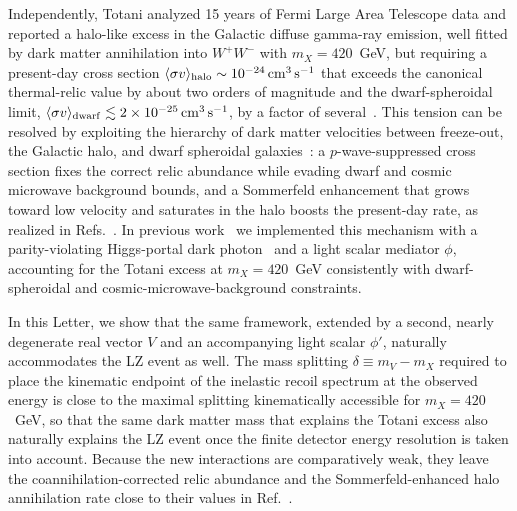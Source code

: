 \documentclass[aps,prl,twocolumn,superscriptaddress,nofootinbib]{revtex4-2}
\begin{document}
Independently, Totani analyzed 15 years of Fermi Large Area Telescope
data and reported a halo-like excess in the Galactic diffuse gamma-ray
emission, well fitted by dark matter annihilation into $W^+W^-$ with
$m_X=420$~GeV, but requiring a present-day cross section
$\langle\sigma v\rangle_{\rm halo}\sim10^{-24}\,{\rm cm}^3\,{\rm s}^{-1}$
that exceeds the canonical thermal-relic value by about two orders of
magnitude and the dwarf-spheroidal limit,
$\langle\sigma v\rangle_{\rm dwarf}\lesssim2\times10^{-25}\,{\rm
cm}^3\,{\rm s}^{-1}$, by a factor of several~\cite{Totani2025}. This
tension can be resolved by exploiting the hierarchy of dark matter
velocities between freeze-out, the Galactic halo, and dwarf spheroidal
galaxies~\cite{Murayama2025,NomuraTotani2026}: a $p$-wave-suppressed
cross section fixes the correct relic abundance while evading dwarf and
cosmic microwave background bounds, and a Sommerfeld enhancement that
grows toward low velocity and saturates in the halo boosts the
present-day rate, as realized in
Refs.~\cite{Jho2025,Yoshimatsu2026,Yamashita2026}. In previous
work~\cite{Yamashita2026} we implemented this mechanism with a
parity-violating Higgs-portal dark
photon~\cite{Yamashita2024,DeFelice2025} and a light scalar mediator
$\phi$, accounting for the Totani excess at $m_X=420$~GeV consistently
with dwarf-spheroidal and cosmic-microwave-background constraints.

In this Letter, we show that the same framework, extended by a
second, nearly degenerate real vector $V$ and an accompanying light
scalar $\phi'$, naturally accommodates the LZ
event as well. The mass splitting $\delta\equiv m_V-m_X$ required to place
the kinematic endpoint of the inelastic recoil spectrum at the observed
energy is close to the maximal splitting kinematically accessible for
$m_X=420$~GeV, so that the same dark matter mass that explains the Totani
excess also naturally explains the LZ event once the finite detector energy
resolution is taken into account. Because the new interactions are
comparatively weak, they leave the coannihilation-corrected relic abundance
and the Sommerfeld-enhanced halo annihilation rate close to their values in
Ref.~\cite{Yamashita2026}.
\end{document}
